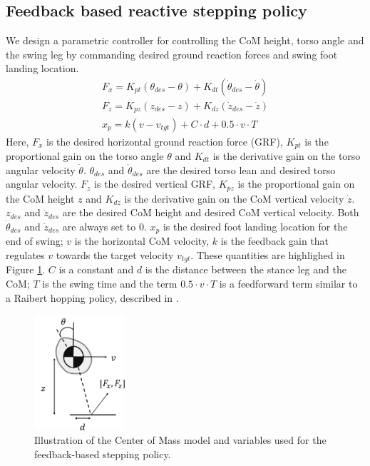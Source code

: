 \subsection{Feedback based reactive stepping policy}
\label{sec:raibert_cont}
We design a parametric controller for controlling the CoM height, torso angle and the swing leg by commanding desired ground reaction forces and swing foot landing location. 
\begin{align}
    \label{eq:raibert}
    F_x = K_{pt}(\theta_{des} - \theta) + K_{dt}(\dot{\theta}_{des} - \dot{\theta}) \\
    F_z = K_{pz}(z_{des} - z) + K_{dz}(\dot{z}_{des} - \dot{z})\\
    x_p = k(v-v_{tgt}) + C \cdot d + 0.5 \cdot v \cdot T
\end{align}
Here, $F_x$ is the desired horizontal ground reaction force (GRF), $K_{pt}$ is the proportional gain on the torso angle $\theta$ and $K_{dt}$ is the derivative gain on the torso angular velocity $\dot{\theta}$. $\theta_{des}$ and $\dot{\theta}_{des}$ are the desired torso lean and desired torso angular velocity. $F_z$ is the desired vertical GRF, $K_{pz}$ is the proportional gain on the CoM height $z$ and $K_{dz}$ is the derivative gain on the CoM vertical velocity $\dot{z}$. $z_{des}$ and $\dot{z}_{des}$ are the desired CoM height and desired CoM vertical velocity. Both $\dot{\theta}_{des}$ and $\dot{z}_{des}$ are always set to $0$. $x_p$ is the desired foot landing location for the end of swing; $v$ is the horizontal CoM velocity, $k$ is the feedback gain that regulates $v$ towards the target velocity $v_{tgt}$. These quantities are highlighed in Figure \ref{fig:raibert_com}. $C$ is a constant and $d$ is the distance between the stance leg and the CoM; $T$ is the swing time and the term $0.5 \cdot v \cdot T$ is a feedforward term similar to a Raibert hopping policy, described in \cite{raibert1986legged}.
\begin{figure}[t]
    \centering
    \includegraphics[width=0.3\textwidth]{img/raibert_com.png}
    \caption{\small{Illustration of the Center of Mass model and variables used for the feedback-based stepping policy.}}
    \label{fig:raibert_com}
\end{figure}

